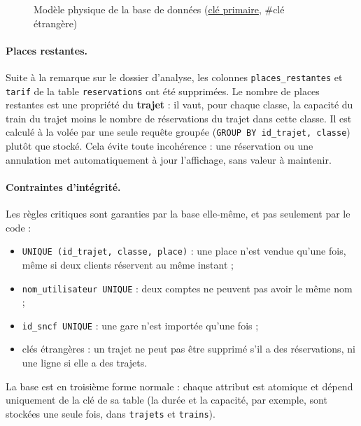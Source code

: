 \documentclass[11pt,a4paper]{article}
\newcommand{\code}[1]{\texttt{#1}}
\begin{document}
\begin{figure}[H]
{}
\caption{Modèle physique de la base de données (\underline{clé primaire}, \#clé étrangère)}\label{fig:bdd}
\end{figure}

\paragraph{Places restantes.}
Suite à la remarque sur le dossier d'analyse, les colonnes \code{places\_restantes} et \code{tarif}
de la table \code{reservations} ont été supprimées. Le nombre de places restantes est une propriété
du \textbf{trajet} : il vaut, pour chaque classe, la capacité du train du trajet moins le nombre de
réservations du trajet dans cette classe. Il est calculé à la volée par une seule requête groupée
(\code{GROUP BY id\_trajet, classe}) plutôt que stocké. Cela évite toute incohérence : une
réservation ou une annulation met automatiquement à jour l'affichage, sans valeur à maintenir.

\paragraph{Contraintes d'intégrité.}
Les règles critiques sont garanties par la base elle-même, et pas seulement par le code :
\begin{itemize}[nosep]
  \item \code{UNIQUE (id\_trajet, classe, place)} : une place n'est vendue qu'une fois, même si deux
        clients réservent au même instant ;
  \item \code{nom\_utilisateur UNIQUE} : deux comptes ne peuvent pas avoir le même nom ;
  \item \code{id\_sncf UNIQUE} : une gare n'est importée qu'une fois ;
  \item clés étrangères : un trajet ne peut pas être supprimé s'il a des réservations, ni une ligne
        si elle a des trajets.
\end{itemize}
La base est en troisième forme normale : chaque attribut est atomique et dépend uniquement de la clé
de sa table (la durée et la capacité, par exemple, sont stockées une seule fois, dans
\code{trajets} et \code{trains}).
\end{document}
